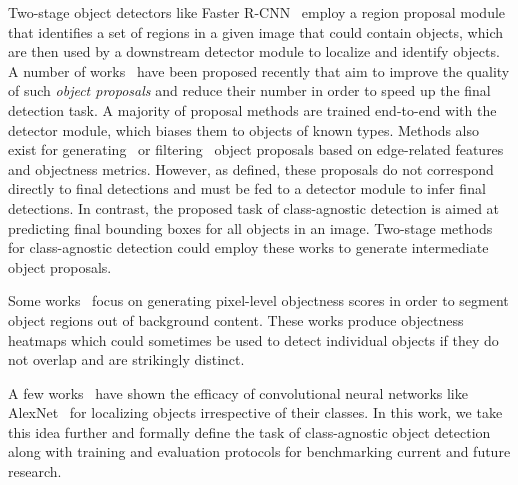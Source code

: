 \documentclass[10pt,twocolumn,letterpaper]{article}
\begin{document}
Two-stage object detectors like Faster R-CNN~\cite{bib:frcnn} employ a region proposal module that identifies a set of regions in a given image that could contain objects, which are then used by a downstream detector module to localize and identify objects. A number of works~\cite{bib:obj_proposal_1,bib:obj_proposal_2,bib:obj_proposal_3,bib:objectness_2,bib:selective_search,bib:obj_prop_pont,bib:obj_prop_endres,bib:obj_prop_zhang} have been proposed recently that aim to improve the quality of such \textit{object proposals} and reduce their number in order to speed up the final detection task. A majority of proposal methods are trained end-to-end with the detector module, which biases them to objects of known types. Methods also exist for generating~\cite{bib:edge_proposal_1,bib:edge_proposal_2_bing,bib:edge_proposal_3_edgeboxes,bib:edge_proposal_4} or filtering~\cite{bib:filter_proposal_1,bib:filter_proposal_2,bib:filter_proposal_3} object proposals based on edge-related features and objectness metrics. However, as defined, these proposals do not correspond directly to final detections and must be fed to a detector module to infer final detections. In contrast, the proposed task of class-agnostic detection is aimed at predicting final bounding boxes for all objects in an image. Two-stage methods for class-agnostic detection could employ these works to generate intermediate object proposals.

Some works~\cite{bib:objectness_1,bib:pixel_objectness} focus on generating pixel-level objectness scores in order to segment object regions out of background content. These works produce objectness heatmaps which could sometimes be used to detect individual objects if they do not overlap and are strikingly distinct.

A few works~\cite{bib:class_generic,bib:scalable} have shown the efficacy of convolutional neural networks like AlexNet~\cite{bib:alexnet} for localizing objects irrespective of their classes. In this work, we take this idea further and formally define the task of class-agnostic object detection along with training and evaluation protocols for benchmarking current and future research.
\end{document}
